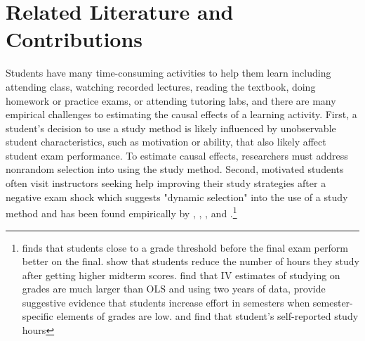 \documentclass[12pt]{article}
\begin{document}

\section{Related Literature and Contributions} \label{background}

Students have many time-consuming activities to help them learn including attending class, watching recorded lectures, reading the textbook, doing homework or practice exams, or attending tutoring labs, and there are many empirical challenges to estimating the causal effects of a learning activity. First, a student's decision to use a study method is likely influenced by unobservable student characteristics, such as motivation or ability, that also likely affect student exam performance. To estimate causal effects, researchers must address nonrandom selection into using the study method. Second, motivated students often visit instructors seeking help improving their study strategies after a negative exam shock which suggests "dynamic selection" into the use of a study method and has been found empirically by \textcite{oettinger2002}, \textcite{ko2005}, \textcite{ss2008}, \textcite{bo2012} and \textcite{bo2015}.\footnote{\textcite{oettinger2002} finds that students close to a grade threshold before the final exam perform better on the final. \textcite{ko2005} show that students reduce the number of hours they study after getting higher midterm scores. \textcite{ss2008} find that IV estimates of studying on grades are much larger than OLS and using two years of data, provide suggestive evidence that students increase effort in semesters when semester-specific elements of grades are low. \textcite{bo2012} and \textcite{bo2015} find that student's self-reported study hours } %
\end{document}
